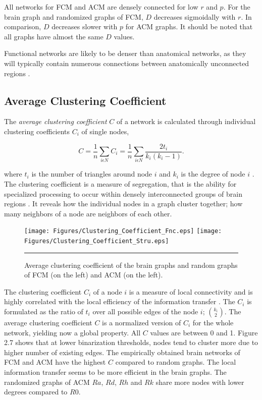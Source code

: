 All networks for FCM and ACM are densely connected for low $r$ and $p$. For the brain graph and randomized graphs of FCM, $D$ decreases sigmoidally with $r$. In comparison, $D$ decreases slower with $p$ for ACM graphs. It should be noted that all graphs have almost the same $D$ values. 

Functional networks are likely to be denser than anatomical networks, as they will typically contain numerous connections between anatomically unconnected regions \citep{DAM09}. 

\subsection{Average Clustering Coefficient}
    
The \textit{average clustering coefficient} $C$ of a network is calculated through individual clustering coefficients $C_i$ of single nodes,

\begin{equation}
C = \frac{1}{n} \sum\limits_{i\epsilon N}C_i = \frac{1}{n}\sum\limits_{i\epsilon N} \frac{2t_i}{k_i(k_i -1)} .
\end{equation} 

where $t_i$ is the number of triangles around node $i$ and $k_i$ is the degree of node $i$ \citep{WAT98}. The clustering coefficient is a measure of segregation, that is the ability for specialized processing to occur within densely interconnected groups of brain regions \citep{RUB10}. It reveals how the individual nodes in a graph cluster together; how many neighbors of a node are neighbors of each other. 

\begin{figure}[htbp]
  \centering
	\texttt{[image: Figures/Clustering\_Coefficient\_Fnc.eps]}
	\texttt{[image: Figures/Clustering\_Coefficient\_Stru.eps]} 
    \rule{35em}{0.5pt}
    \caption[Clustering Coefficient]{Average clustering coefficient of the brain graphs and random graphs of FCM (on the left) and ACM (on the left). }
  \label{fig:Clustering Coefficient}
\end{figure}

The clustering coefficient $C_i$ of a node $i$ is a measure of local connectivity and is highly correlated with the local efficiency of the information transfer \citep{LAT01}. The $C_i$ is formulated as the ratio of $t_i$ over all possible edges of the node $i$; ${k_i \choose 2} $. The average clustering coefficient $C$ is a normalized version of $C_i$ for the whole network, yielding now a global property. All $C$ values are between 0 and 1. Figure 2.7 shows that at lower binarization thresholds, nodes tend to cluster more due to higher number of existing edges. The empirically obtained brain networks of FCM and ACM have the highest $C$ compared to random graphs. The local information transfer seems to be more efficient in the brain graphs.  The randomized graphs of ACM $Ra$, $Rd$, $Rh$ and $Rk$ share more nodes with lower degrees compared to $R0$.

